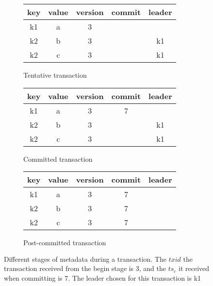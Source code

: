 \begin{figure}[!t]
  \centering
  
  \begin{subfigure}[t]{\columnwidth}
      \centering
    \begin{tabular}{|c|c|c|c|c|}
      \hline
      key & value & version & commit& leader\\
      \hline
      \hline
      k1 & a & 3 & &\\
      \hline
      k2 & b & 3 & &k1\\
      \hline
      k2 & c & 3 & &k1\\
      \hline
    \end{tabular}
	\caption[]{Tentative transaction}
    \label{fig:model:tentative}
  \end{subfigure}
  
  \begin{subfigure}[t]{\columnwidth}
    \centering
    \begin{tabular}{|c|c|c|c|c|}
      \hline
      key & value & version & commit& leader\\
      \hline
      \hline
      k1 & a & 3 & 7&\\
      \hline
      k2 & b & 3 & &k1\\
      \hline
      k2 & c & 3 & &k1\\
      \hline
    \end{tabular}
	\caption[]{Committed transaction}
    \label{fig:model:committed}
  \end{subfigure}


  \begin{subfigure}[t]{\columnwidth}
    \centering
    \begin{tabular}{|c|c|c|c|c|}
      \hline
      key & value & version & commit& leader\\
      \hline
      \hline
      k1 & a & 3 & 7&\\
      \hline
      k2 & b & 3 & 7&\\
      \hline
      k2 & c & 3 & 7&\\
      \hline
    \end{tabular}
	\caption[]{Post-committed transaction}
    \label{fig:model:postcommit}
  \end{subfigure}

  
  \caption{Different stages of metadata during a transaction. The $txid$ the transaction received from the begin stage is 3, and the $ts_c$ it received when committing is 7. The leader chosen for this transaction is k1 }
  \label{fig:model}
\end{figure}


